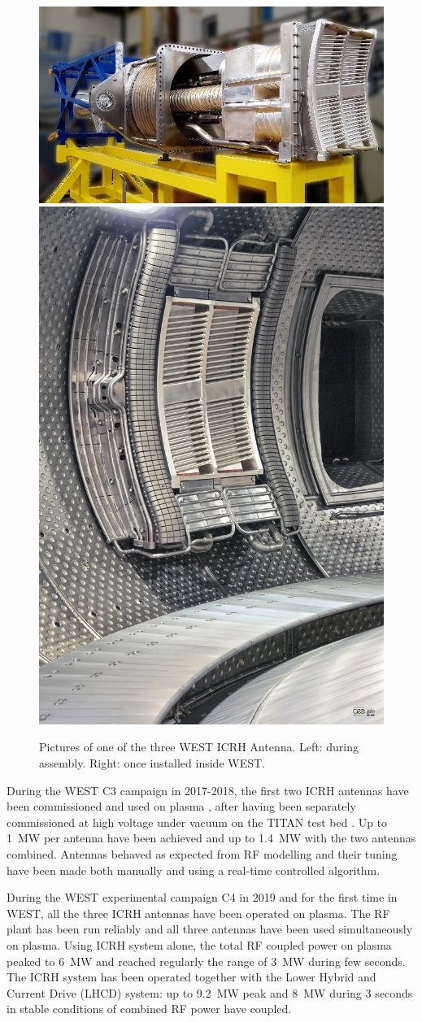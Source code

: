 {\begin{figure}
	\centering
	\includegraphics[width=0.69\linewidth]{figures/chap3/WEST_ICRH/WEST_ICRH_antenna_picture}	\includegraphics[width=0.29\linewidth]{figures/chap3/WEST_ICRH/WEST_ICRH_antenna_inside_WEST}
	\caption{Pictures of one of the three WEST ICRH Antenna. Left: during assembly. Right: once installed inside WEST.}
	\label{fig:westicrhantennapicture}
\end{figure}

During the WEST C3 campaign in 2017-2018, the first two ICRH antennas have been commissioned and used on plasma , after having been separately commissioned at high voltage under vacuum on the TITAN test bed . Up to 1~MW per antenna have been achieved and up to 1.4~MW with the two antennas combined. Antennas behaved as expected from RF modelling and their tuning have been made both manually and using a real-time controlled algorithm. 

During the WEST experimental campaign C4 in 2019 and for the first time in WEST, all the three ICRH antennas have been operated on plasma. The RF plant has been run reliably and all three antennas have been used simultaneously on plasma. Using ICRH system alone, the total RF coupled power on plasma peaked to 6~MW and reached regularly the range of 3~MW during few seconds. The ICRH system has been operated together with the Lower Hybrid and Current Drive (LHCD) system: up to 9.2~MW peak and 8~MW during 3 seconds in stable conditions of combined RF power have coupled.

}
